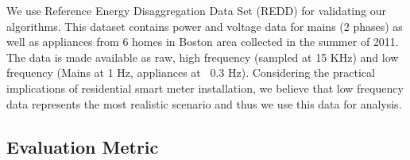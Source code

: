 \documentclass[conference]{IEEEtran}
\newcommand{\figref}[1]{Figure~\ref{#1}}
\begin{document}
We use Reference Energy Disaggregation Data Set (REDD) \cite{redd} for validating our algorithms. This dataset contains power and voltage data for mains (2 phases) as well as appliances from 6 homes in Boston area collected in the summer of 2011. The data is made available as raw, high frequency (sampled at 15 KHz) and low frequency (Mains at 1 Hz, appliances at ~0.3 Hz). Considering the practical implications of residential smart meter installation, we believe that low frequency data represents the most realistic scenario and thus we use this data for analysis. 



%	
%
\subsection{Evaluation Metric}
\end{document}
